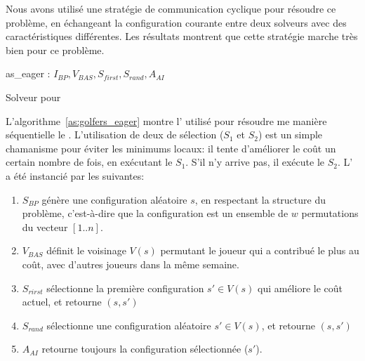 Nous avons utilisé une stratégie de communication cyclique pour résoudre ce problème, en échangeant la configuration courante entre deux solveurs avec des caractéristiques différentes. Les résultats montrent que cette stratégie marche très bien pour ce problème.

\begin{algorithm}
\dontprintsemicolon
\SetNoline
{}
   as\_eager\;
\algoindent {} : $I_{BP}, V_{BAS}, S_{first}, S_{rand}, A_{AI}$ \;
\caption{Solveur pour \SGP}\label{as:golfers_eager}
\end{algorithm}

L'algorithme~\ref{as:golfers_eager} montre l'\as{} utilisé pour résoudre me manière séquentielle le \SGP{}. L'utilisation de deux \ms{} de sélection ($S_1$ et $S_2$) est un simple chamanisme pour éviter les minimums locaux: il tente d'améliorer le coût un certain nombre de fois, en exécutant le \om{} $S_1$. S'il n'y arrive pas, il exécute le \om{} $S_2$. L'\as{} a été instancié par les \oms{} suivantes:

\begin{enumerate}
\item $S_{BP}$ génère une configuration aléatoire $s$, en respectant la structure du problème, c'est-à-dire que la configuration est un ensemble de $w$ permutations du vecteur $[1..n]$.
\item $V_{BAS}$ définit le voisinage $V \left(s\right)$ permutant le joueur qui a contribué le plus au coût, avec d'autres joueurs dans la même semaine.
\item $S_{rirst}$ sélectionne la première configuration $s'\in V\left (s\right)$ qui améliore le coût actuel, et retourne $(s, s')$
\item $S_{rand}$ sélectionne une configuration aléatoire $s'\in V\left(s\right)$, et retourne $(s, s')$
\item $A_{AI}$ retourne toujours la configuration sélectionnée ($s'$).
\end{enumerate}

